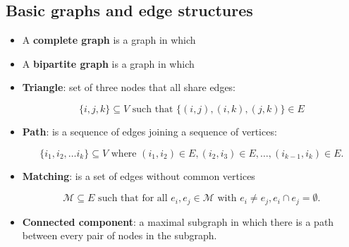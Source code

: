 \documentclass[11  pt]{exam}
\begin{document}
	\vs{3cm}
	
	\subsection{Basic graphs and edge structures}
	
	\begin{itemize}
		\item A \textbf{complete graph} is a graph in which \\
		
		\vspace{2cm}
		
		\item A \textbf{bipartite graph} is a graph in which \\
		
		\vspace{2cm}
		
		\item \textbf{Triangle}: set of three nodes that all share edges: 
		
		\begin{equation*}
			\{i,j,k\} \subseteq V \text{ such that }  \{ (i,j), (i,k),  (j,k)\} \in E
		\end{equation*}
		\vspace{2cm}
		
		\item \textbf{Path}: is a sequence of edges joining a sequence of vertices:
		
		\begin{equation*}
			\{i_1, i_2, \hdots i_k\}\subseteq V \text{ where } (i_1, i_2) \in E,  (i_2, i_3) \in E, \hdots , (i_{k-1}, i_k) \in E.
		\end{equation*}
		\vspace{2cm}
		
		\item \textbf{Matching}: is a set of edges without common vertices
		
		\begin{equation*}
			\mathcal{M} \subseteq E \text{ such that for all } e_i, e_j \in \mathcal{M} \text{ with } e_i \neq e_j, e_i \cap e_j = \emptyset.
		\end{equation*}
		\vspace{4cm}
		
		\item \textbf{Connected component}: a maximal subgraph in which there is a path between every pair of nodes in the subgraph.
		\vspace{2cm}
		
	\end{itemize}
	\newpage
	
\end{document}
